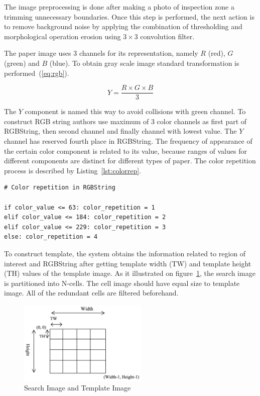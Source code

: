 \documentclass{lutmscthesis}[2010/09/22]
\begin{document}
The image preprocessing is done after making a
photo of inspection zone a trimming unnecessary boundaries. Once
this step is performed, the next action is to remove
background noise by applying the combination
of thresholding and morphological operation
erosion using $3\times3$ convolution filter.

The paper image uses 3 channels for its representation,
namely $R$ (red), $G$ (green) and $B$ (blue). To obtain gray scale
image standard transformation is performed~(\ref{eq:rgb}).

\begin{equation}\label{eq:rgb}
  Y = \frac{R \times G \times B}{3}
\end{equation}

The $Y$ component is named this way to avoid collisions with green channel.
To construct RGB string authors use maximum of 3 color channels
as first part of RGBString, then second channel and finally
channel with lowest value. The $Y$ channel has reserved
fourth place in RGBString. The frequency of appearance
of the certain color component is related to its value,
because ranges of values for different components are
distinct for different types of paper. The color repetition
process is described by Listing~\ref{lst:colorrep}.

\begin{lstlisting}[caption={Color Repetiotion Calculation}, label={lst:colorep}]
# Color repetition in RGBString

if color_value <= 63: color_repetition = 1
elif color_value <= 184: color_repetition = 2
elif color_value <= 229: color_repetition = 3
else: color_repetition = 4
\end{lstlisting}

To construct template, the system obtains the information
related to region of interest and RGBString
after getting template width (TW) and template height (TH)
values of the template image. As it illustrated on figure~\ref{afig:searchimg}, the
search image is partitioned into N-cells. The cell
image should have equal size to template image.
All of the redundant cells are filtered beforehand.

\begin{figure}[htp]
  {\par\centering
  \includegraphics[width=0.55\textwidth]{searchimg}
  \par}
  \caption{Search Image and Template Image~\cite{Rahman:2009}}
  \label{afig:searchimg}
\end{figure}
\end{document}
